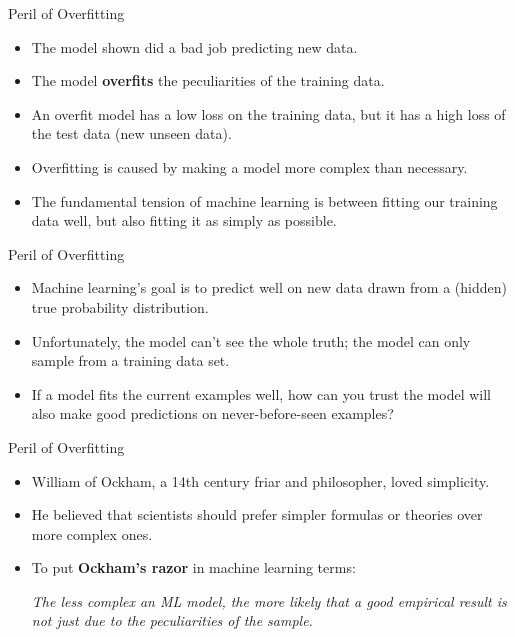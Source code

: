 \documentclass{beamer}
\begin{document}
\begin{frame}{Peril of Overfitting}
\begin{itemize}
\item The model shown did a bad job predicting new data.

\medskip
\item The model {\bf overfits} the peculiarities of the training data. 

\medskip
\item An overfit model has a low loss on the training data, but it has a high loss of the test data (new unseen data). 

\medskip
\item Overfitting is caused by making a model more complex than necessary. 

\medskip
\item The fundamental tension of machine learning is between fitting our training data well, but also fitting it as simply as possible.
\end{itemize}
\end{frame}


\begin{frame}{Peril of Overfitting}
\begin{itemize}
\item Machine learning's goal is to predict well on new data drawn from a (hidden) true probability distribution. 

\medskip
\item Unfortunately, the model can't see the whole truth; the model can only sample from a training data set. 

\medskip
\item If a model fits the current examples well, how can you trust the model will also make good predictions on never-before-seen examples?
\end{itemize}
\end{frame}


\begin{frame}{Peril of Overfitting}
\begin{itemize}
\item William of Ockham, a 14th century friar and philosopher, loved simplicity. 

\medskip
\item He believed that scientists should prefer simpler formulas or theories over more complex ones. 

\medskip    
\item To put {\bf Ockham's razor} in machine learning terms:
    
\medskip
\emph{The less complex an ML model, the more likely that a good empirical result is not just due to the peculiarities of the sample.}
\end{itemize}
\end{frame}
\end{document}
